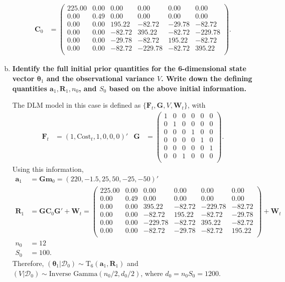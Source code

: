 \documentclass{article}
\newcommand{\sD}{\mathcal{D}}
\newcommand{\bm}{\mathbf{m}}
\newcommand{\bC}{\mathbf{C}}
\newcommand{\btheta}{\boldsymbol{\theta}}
\newcommand{\bF}{\mathbf{F}}
\newcommand{\bG}{\mathbf{G}}
\newcommand{\bW}{\mathbf{W}}
\newcommand{\ba}{\mathbf{a}}
\newcommand{\bR}{\mathbf{R}}
\begin{document}
\begin{enumerate}[(a)]
\begin{align*}
			\bC_0 & = \begin{pmatrix}
			225.00 & 0.00 & 0.00 & 0.00 & 0.00 & 0.00 \\ 
			0.00 & 0.49 & 0.00 & 0.00 & 0.00 & 0.00 \\ 
			0.00 & 0.00 & 195.22 & -82.72 & -29.78 & -82.72 \\ 
			0.00 & 0.00 & -82.72 & 395.22 & -82.72 & -229.78 \\ 
			0.00 & 0.00 & -29.78 & -82.72 & 195.22 & -82.72 \\ 
			0.00 & 0.00 & -82.72 & -229.78 & -82.72 & 395.22 \\ 
			\end{pmatrix}.
		\end{align*}
		
		\item \textbf{Identify the full initial prior quantities for the 6-dimensional state vector $\btheta_1$ and the observational variance $V$. Write down the defining quantities $\ba_1,\bR_1,n_0$, and $S_0$ based on the above initial information.}
		
		The DLM model in this case is defined as $\{ \bF_t, \bG,V,\bW_t \}$, with 
		\begin{align*}
			\bF_t & = (1,\text{Cost}_t,1,0,0,0)' &
			\bG & = \begin{pmatrix}
			1 & 0 & 0 & 0 & 0 & 0 \\
			0 & 1 & 0 & 0 & 0 & 0 \\
			0 & 0 & 0 & 1 & 0 & 0 \\
			0 & 0 & 0 & 0 & 1 & 0 \\
			0 & 0 & 0 & 0 & 0 & 1 \\
			0 & 0 & 1 & 0 & 0 & 0 \\
			\end{pmatrix}.
		\end{align*}
		Using this information,
		\begin{align*}
			\ba_1 & = \bG\bm_0 = (220,  -1.5,  25,  50, -25, -50)' \\
			\bR_1 & = \bG\bC_0\bG' + \bW_t = \begin{pmatrix}
			225.00 & 0.00 & 0.00 & 0.00 & 0.00 & 0.00 \\ 
			0.00 & 0.49 & 0.00 & 0.00 & 0.00 & 0.00 \\ 
			0.00 & 0.00 & 395.22 & -82.72 & -229.78 & -82.72 \\ 
			0.00 & 0.00 & -82.72 & 195.22 & -82.72 & -29.78 \\ 
			0.00 & 0.00 & -229.78 & -82.72 & 395.22 & -82.72 \\ 
			0.00 & 0.00 & -82.72 & -29.78 & -82.72 & 195.22 \\ 
			\end{pmatrix}  + \bW_t\\
			n_0 & = 12 \\
			S_0 & = 100.
		\end{align*}
		Therefore, $(\btheta_1|\sD_0) \sim \text{T}_{6}(\ba_1,\bR_1)$ and $(V|\sD_0) \sim \text{Inverse Gamma}(n_0/2,d_0/2)$, where $d_0 = n_0S_0 = 1200$.
		

\end{enumerate}
\end{document}
